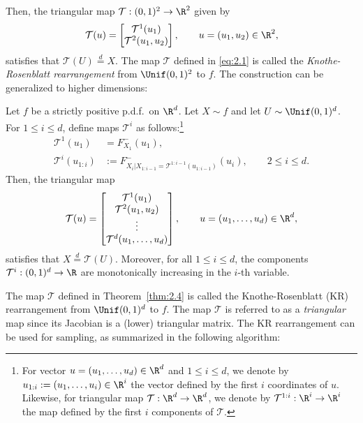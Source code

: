 Then, the triangular map $\mathcal{T} : (0,1)^2 \to \R^2$ given by
\begin{equation}
  \mathcal{T}(u) = \begin{bmatrix} \mathcal{T}^1(u_1) \\ \mathcal{T}^2(u_1, u_2) \end{bmatrix}, \qquad u = (u_1, u_2) \in \R^2,
  \label{eq:2.1}
\end{equation}
satisfies that $\mathcal{T}(U) \overset{d}{=} X$. The map $\mathcal{T}$ defined in \eqref{eq:2.1} is called the \textit{Knothe-Rosenblatt rearrangement} from $\Unif(0,1)^2$ to $f$. The construction can be generalized to higher dimensions:

\begin{theorem}
\label{thm:2.4}
Let $f$ be a strictly positive p.d.f.\ on $\R^d$. Let $X \sim f$ and let $U \sim \Unif(0,1)^d$. For $1 \le i \le d$, define maps $\mathcal{T}^i$ as follows:\footnote{For vector $u = (u_1, \ldots, u_d) \in \R^d$ and $1 \le i \le d$, we denote by $u_{1:i} := (u_1, \ldots, u_i) \in \R^i$ the vector defined by the first $i$ coordinates of $u$. Likewise, for triangular map $\mathcal{T} : \R^d \to \R^d$, we denote by $\mathcal{T}^{1:i} : \R^i \to \R^i$ the map defined by the first $i$ components of $\mathcal{T}$.}
\begin{align}
  \mathcal{T}^1(u_1) &= F_{X_1}^-(u_1), \label{eq:2.2} \\
  \mathcal{T}^i(u_{1:i}) &:= F_{X_i|X_{1:i-1}=\mathcal{T}^{1:i-1}(u_{1:i-1})}^-(u_i), \qquad 2 \le i \le d. \label{eq:2.3}
\end{align}
Then, the triangular map
\begin{equation}
  \mathcal{T}(u) = \begin{bmatrix} \mathcal{T}^1(u_1) \\ \mathcal{T}^2(u_1, u_2) \\ \vdots \\ \mathcal{T}^d(u_1, \ldots, u_d) \end{bmatrix}, \qquad u = (u_1, \ldots, u_d) \in \R^d,
  \label{eq:2.4}
\end{equation}
satisfies that $X \overset{d}{=} \mathcal{T}(U)$. Moreover, for all $1 \le i \le d$, the components $\mathcal{T}^i : (0,1)^d \to \R$ are monotonically increasing in the $i$-th variable.
\end{theorem}

The map $\mathcal{T}$ defined in Theorem~\ref{thm:2.4} is called the Knothe-Rosenblatt (KR) rearrangement
from $\Unif(0,1)^d$ to $f$. The map $\mathcal{T}$ is referred to as a \textit{triangular} map since its Jacobian is a
(lower) triangular matrix. The KR rearrangement can be used for sampling, as summarized in
the following algorithm:

